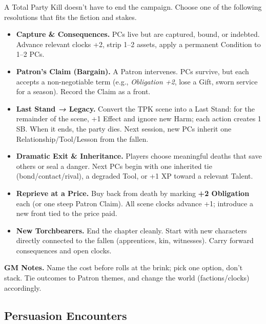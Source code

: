 \begin{fatebox}
  A Total Party Kill doesn’t have to end the campaign. Choose one of the following resolutions that fits the fiction and stakes.
  
  \begin{itemize}
    \item \textbf{Capture \& Consequences.} PCs live but are captured, bound, or indebted. Advance relevant clocks +2, strip 1–2 assets, apply a permanent Condition to 1–2 PCs.
  
    \item \textbf{Patron’s Claim (Bargain).} A Patron intervenes. PCs survive, but each accepts a non-negotiable term (e.g., \emph{Obligation +2}, lose a Gift, sworn service for a season). Record the Claim as a front.
  
    \item \textbf{Last Stand \emph{→} Legacy.} Convert the TPK scene into a Last Stand: for the remainder of the scene, +1 Effect and ignore new Harm; each action creates 1 SB. When it ends, the party dies. Next session, new PCs inherit one Relationship/Tool/Lesson from the fallen.
  
    \item \textbf{Dramatic Exit \& Inheritance.} Players choose meaningful deaths that save others or seal a danger. Next PCs begin with one inherited tie (bond/contact/rival), a degraded Tool, or +1 XP toward a relevant Talent.
  
    \item \textbf{Reprieve at a Price.} Buy back from death by marking \textbf{+2 Obligation} each (or one steep Patron Claim). All scene clocks advance +1; introduce a new front tied to the price paid.
  
    \item \textbf{New Torchbearers.} End the chapter cleanly. Start with new characters directly connected to the fallen (apprentices, kin, witnesses). Carry forward consequences and open clocks.
  \end{itemize}
  
  \textbf{GM Notes.} Name the cost before rolls at the brink; pick one option, don’t stack. Tie outcomes to Patron themes, and change the world (factions/clocks) accordingly.
  \end{fatebox}

\subsection{Persuasion Encounters}

